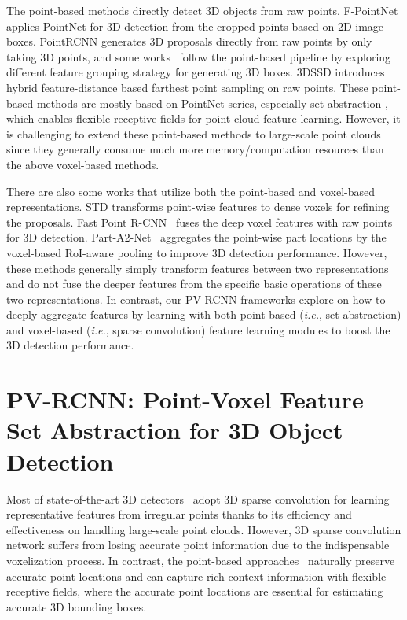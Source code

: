 \documentclass[natbib,twocolumn]{svjour3}          \smartqed  \usepackage{graphicx}
\begin{document}
The point-based methods directly detect 3D objects from raw points. 
F-PointNet \citep{qi2017frustum} applies PointNet \citep{qi2017pointnet,qi2017pointnet++} for 3D detection from the cropped points based on 2D image boxes. PointRCNN \citep{shi2019pointrcnn} generates 3D proposals directly from raw points by only taking 3D points, and some  works~\citep{qi2019deep,cheng2021back,wang2022rbgnet} follow the point-based pipeline by exploring different feature grouping strategy for generating 3D boxes. 3DSSD \citep{yang20203dssd} introduces hybrid feature-distance based farthest point sampling on raw points.
These point-based methods are mostly based on PointNet series, especially set abstraction \citep{qi2017pointnet++}, which enables flexible receptive fields for point cloud feature learning. However, it is challenging to extend these point-based methods to large-scale point clouds since they generally consume much more memory/computation resources than the above voxel-based methods.

There are also some works that utilize both the point-based and voxel-based representations. STD \citep{std2019yang} transforms point-wise features to dense voxels for refining the proposals. Fast Point R-CNN~\citep{chen2019fast} fuses the deep voxel features with raw points for 3D detection. Part-A2-Net~\citep{shi2020part} aggregates the point-wise part locations by the voxel-based RoI-aware pooling to improve 3D detection performance. 
However, these methods generally simply transform features between two representations and do not fuse the deeper features from the specific basic operations of these two representations.
In contrast, our PV-RCNN frameworks explore on how to deeply aggregate features by learning with both point-based (\emph{i.e.}, set abstraction) and voxel-based (\emph{i.e.}, sparse convolution) feature learning modules to boost the 3D detection performance.



\section{PV-RCNN: Point-Voxel Feature Set Abstraction for 3D Object Detection}\label{sec:pvrcnnv1}
Most of state-of-the-art 3D detectors~\citep{shi2020part,yin2021center,sheng2021} adopt 3D sparse convolution for learning representative features from irregular points thanks to its efficiency and effectiveness on handling large-scale point clouds. However, 3D sparse convolution network suffers from losing accurate point information due to the indispensable voxelization process. 
In contrast, the point-based approaches~\citep{qi2017pointnet,qi2017pointnet++}  naturally preserve accurate point locations and can capture rich context information with flexible receptive fields, where the accurate point locations are essential for estimating accurate 3D bounding boxes.
\end{document}
